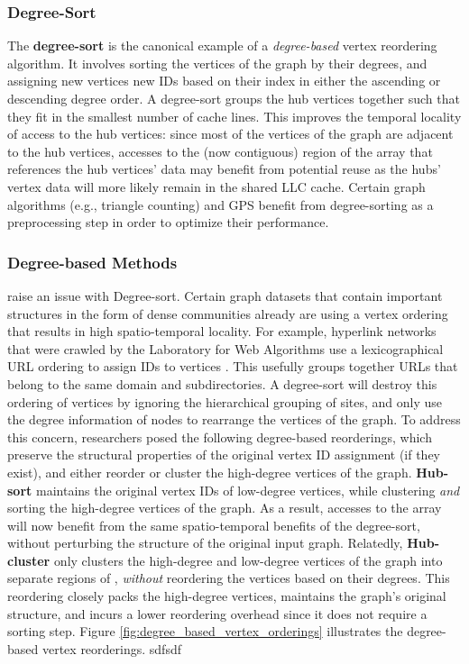 \subsubsection{Degree-Sort}
The \textbf{degree-sort} is the canonical example of a \textit{degree-based} vertex reordering algorithm. 
It involves sorting the vertices of the graph by their degrees, and assigning new vertices new IDs based on their index in either the ascending or descending degree order. A degree-sort groups the hub vertices together such that they fit in the smallest number of cache lines. This improves the temporal locality of access to the hub vertices: since most of the vertices of the graph are adjacent to the hub vertices, accesses to the (now contiguous) region of the \vdata{} array that references the hub vertices' data may benefit from potential reuse as the hubs' vertex data will more likely remain in the shared LLC cache. Certain graph algorithms (e.g., triangle counting) \cite{donato2018triangle, koohi2022lotus} and \ac{GPS} \cite{graptor, powerlyra} benefit from degree-sorting as a preprocessing step in order to optimize their performance. 


\subsubsection{Degree-based Methods}
\citet{dbg} raise an issue with Degree-sort. Certain graph datasets that contain important structures in the form of dense communities already are using a vertex ordering that results in high spatio-temporal locality. For example, hyperlink networks that were crawled by the Laboratory for Web Algorithms use a lexicographical URL ordering to assign IDs to vertices \cite{lwa}. This usefully groups together URLs that belong to the same domain and subdirectories. A degree-sort will destroy this ordering of vertices by ignoring the hierarchical grouping of sites, and only use the degree information of nodes to rearrange the vertices of the graph. 
To address this concern, researchers posed the following degree-based reorderings, which preserve the structural properties of the original vertex ID assignment (if they exist), and either reorder or cluster the high-degree vertices of the graph. 
\textbf{Hub-sort} \cite{zhang2016optimizing} maintains the original vertex IDs of low-degree vertices, while clustering \textit{and} sorting the high-degree vertices of the graph. As a result, accesses to the \vdata{} array will now benefit from the same spatio-temporal benefits of the degree-sort, without perturbing the structure of the original input graph.
Relatedly, \textbf{Hub-cluster} \cite{lwr} only clusters the high-degree and low-degree vertices of the graph into separate regions of \vdata{}, \textit{without} reordering the vertices based on their degrees. This reordering closely packs the high-degree vertices, maintains the graph's original structure, and incurs a lower reordering overhead since it does not require a sorting step.
Figure \ref{fig:degree_based_vertex_orderings} illustrates the degree-based vertex reorderings.
sdfsdf


